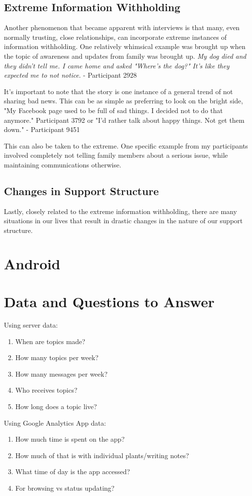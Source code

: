   \subsection{Extreme Information Withholding}
  Another phenomenon that became apparent with interviews is that
  many, even normally trusting, close relationships,
  can incorporate extreme instances of information withholding.
  One relatively whimsical example was brought up
  when the topic of awareness and updates from family was brought up.
  \textit{
    My dog died and they didn't tell me.
    I came home and asked "Where's the dog?"
    It's like they expected me to not notice.
  } - Participant 2928

  It's important to note that the story is one instance of a general
  trend of not sharing bad news.
  This can be as simple as preferring to look on the bright side,
  "My Facebook page used to be full of sad things.
  I decided not to do that anymore." Participant 3792
  or "I'd rather talk about happy things. Not get them down."
  - Participant 9451
  
  This can also be taken to the extreme.
  One specific example from my participants involved
  completely not telling family members about a serious issue,
  while maintaining communications otherwise.

  \subsection{Changes in Support Structure}
  Lastly, closely related to the extreme information withholding,
  there are many situations in our lives that result in
  drastic changes in the nature of our support structure.



\section{Android}
\label{sec:Android}

\section{Data and Questions to Answer}

  Using server data:
  \begin{enumerate}
    \item When are topics made?
    \item How many topics per week?
    \item How many messages per week?
    \item Who receives topics?
    \item How long does a topic live?
  \end{enumerate}

  Using Google Analytics App data:
  \begin{enumerate}
    \item How much time is spent on the app?
    \item How much of that is with individual plants/writing notes?
    \item What time of day is the app accessed?
    \item For browsing vs status updating?
  \end{enumerate}

